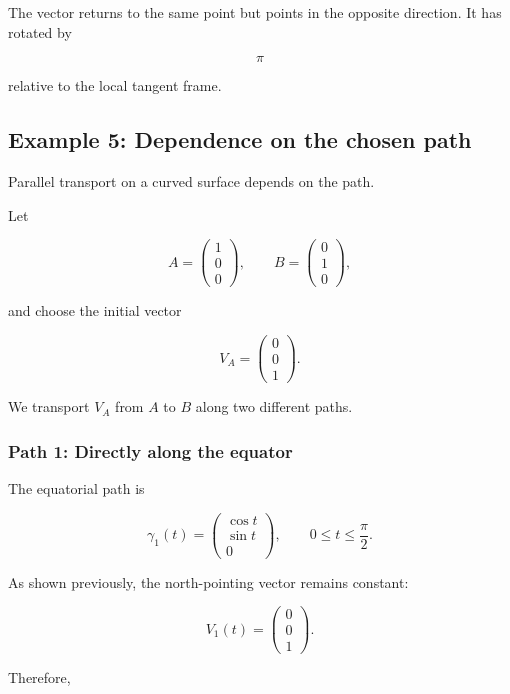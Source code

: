 \documentclass[12pt,a4paper]{article}
\theoremstyle{notespace}
\begin{document}
The vector returns to the same point but points in the opposite
direction. It has rotated by

\[
\pi
\]

relative to the local tangent frame.

\subsection{Example 5: Dependence on the chosen path}

Parallel transport on a curved surface depends on the path.

Let

\[
A=
\begin{pmatrix}
	1\\
	0\\
	0
\end{pmatrix},
\qquad
B=
\begin{pmatrix}
	0\\
	1\\
	0
\end{pmatrix},
\]

and choose the initial vector

\[
V_A=
\begin{pmatrix}
	0\\
	0\\
	1
\end{pmatrix}.
\]

We transport \(V_A\) from \(A\) to \(B\) along two different paths.

\subsubsection{Path 1: Directly along the equator}

The equatorial path is

\[
\gamma_1(t)
=
\begin{pmatrix}
	\cos t\\
	\sin t\\
	0
\end{pmatrix},
\qquad
0\leq t\leq\frac{\pi}{2}.
\]

As shown previously, the north-pointing vector remains constant:

\[
V_1(t)
=
\begin{pmatrix}
	0\\
	0\\
	1
\end{pmatrix}.
\]

Therefore,
\end{document}
